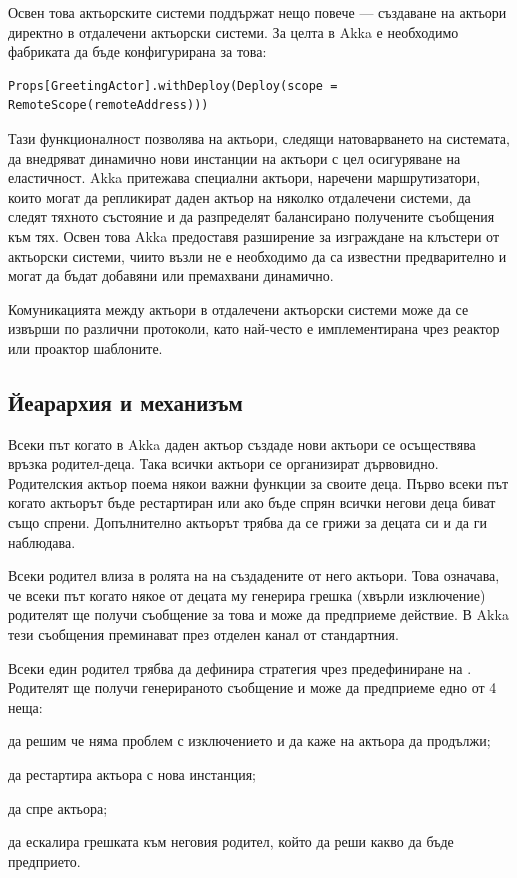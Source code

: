 Освен това актьорските системи поддържат нещо повече — създаване на актьори директно в отдалечени актьорски системи. За целта в Akka е необходимо  фабриката да бъде конфигурирана за това:

\begin{lstlisting}
Props[GreetingActor].withDeploy(Deploy(scope = RemoteScope(remoteAddress)))
\end{lstlisting}

Тази функционалност позволява на актьори, следящи натоварването на системата, да внедряват динамично нови инстанции на актьори с цел осигуряване на еластичност. Akka притежава специални актьори, наречени маршрутизатори, които могат да репликират даден актьор на няколко отдалечени системи, да следят тяхното състояние и да разпределят балансирано получените съобщения към тях. Освен това Akka предоставя разширение за изграждане на клъстери от актьорски системи, чиито възли не е необходимо да са известни предварително и могат да бъдат добавяни или премахвани динамично.

Комуникацията между актьори в отдалечени актьорски системи може да се извърши по различни протоколи, като най-често е имплементирана чрез реактор или проактор шаблоните.

\subsection{Йеарархия и  механизъм}

Всеки път когато в Akka даден актьор създаде нови актьори се осъществява връзка родител-деца. Така всички актьори се организират дървовидно. Родителския актьор поема някои важни функции за своите деца. Първо всеки път когато актьорът бъде рестартиран или ако бъде спрян всички негови деца биват също спрени. Допълнително актьорът трябва да се грижи за децата си и да ги наблюдава.

Всеки родител влиза в ролята на  на създадените от него актьори. Това означава, че всеки път когато някое от децата му генерира грешка (хвърли изключение) родителят ще получи съобщение за това и може да предприеме действие. В Akka тези съобщения преминават през отделен канал от стандартния.

Всеки един родител трябва да дефинира  стратегия чрез предефиниране на . Родителят ще получи генерираното съобщение и може да предприеме едно от 4 неща:

\begin{itemize*}
  \item да решим че няма проблем с изключението и да каже на актьора да продължи;
  \item да рестартира актьора с нова инстанция;
  \item да спре актьора;
  \item да ескалира грешката към неговия родител, който да реши какво да бъде предприето.
\end{itemize*}

